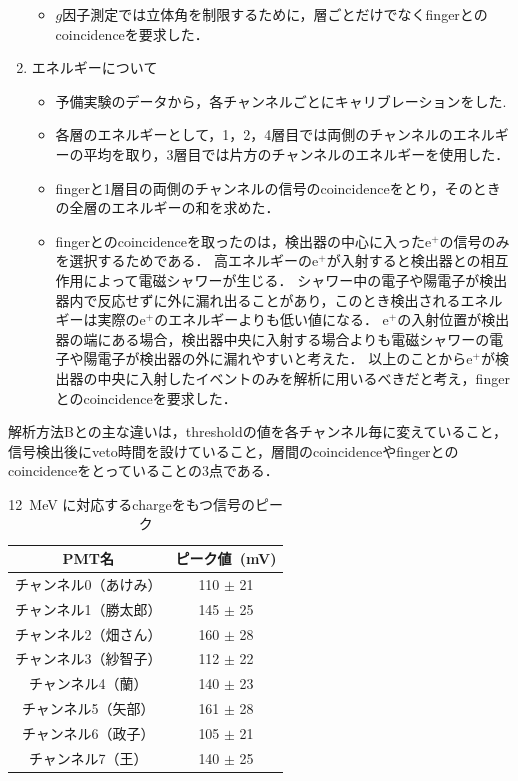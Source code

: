 \begin{enumerate}
\begin{itemize}
	  \item $g$因子測定では立体角を制限するために，層ごとだけでなくfingerとのcoincidenceを要求した．
	 \end{itemize}
   \item エネルギーについて
	 \begin{itemize}
	  \item 予備実験のデータから，各チャンネルごとにキャリブレーションをした.%
	  \item 各層のエネルギーとして，1，2，4層目では両側のチャンネルのエネルギーの平均を取り，3層目では片方のチャンネルのエネルギーを使用した．
	  \item fingerと1層目の両側のチャンネルの信号のcoincidenceをとり，そのときの全層のエネルギーの和を求めた．
	  \item fingerとのcoincidenceを取ったのは，検出器の中心に入ったe$^{+}$の信号のみを選択するためである．
		高エネルギーのe$^{+}$が入射すると検出器との相互作用によって電磁シャワーが生じる．
		シャワー中の電子や陽電子が検出器内で反応せずに外に漏れ出ることがあり，このとき検出されるエネルギーは実際のe$^{+}$のエネルギーよりも低い値になる．
		e$^{+}$の入射位置が検出器の端にある場合，検出器中央に入射する場合よりも電磁シャワーの電子や陽電子が検出器の外に漏れやすいと考えた．
		以上のことからe$^{+}$が検出器の中央に入射したイベントのみを解析に用いるべきだと考え，fingerとのcoincidenceを要求した．
	 \end{itemize}
  \end{enumerate}

  解析方法Bとの主な違いは，thresholdの値を各チャンネル毎に変えていること，信号検出後にveto時間を設けていること，層間のcoincidenceやfingerとのcoincidenceをとっていることの3点である．
  \begin{table}[h]
   \caption{12~MeV に対応するchargeをもつ信号のピーク}
   \label{12MeVpeak}
  \begin{center}
   \begin{tabular}{cc}\toprule
    PMT名&ピーク値~(mV) \\ \hline
    チャンネル0（あけみ）&110 $\pm$ 21 \\
    チャンネル1（勝太郎）&145 $\pm$ 25 \\
    チャンネル2（畑さん）&160 $\pm$ 28 \\
    チャンネル3（紗智子）&112 $\pm$ 22 \\
    チャンネル4（蘭）  &140 $\pm$ 23 \\
    チャンネル5（矢部） &161 $\pm$ 28 \\
    チャンネル6（政子） &105 $\pm$ 21 \\
    チャンネル7（王）  &140 $\pm$ 25 \\ \bottomrule
   \end{tabular}
  \end{center} 
  \end{table}


